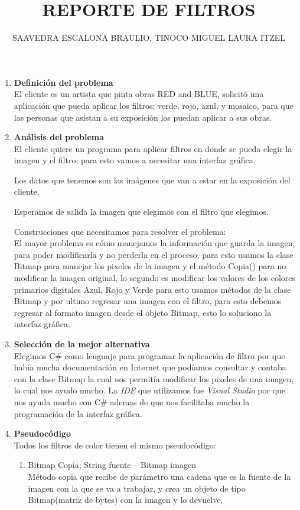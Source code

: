 \documentclass[12pt]{article}
\title{REPORTE DE FILTROS}
\author{SAAVEDRA ESCALONA BRAULIO, TINOCO MIGUEL LAURA ITZEL}
\begin{document}
	\begin{enumerate}
	
	\item \textbf{Definición del problema}\\
	El cliente es un artista que pinta obras RED and BLUE, solicitó una aplicación que pueda aplicar los filtros; verde, rojo, azul, y mosaico, para que las personas que asistan a su exposición los puedan aplicar a sus obras.
	
	\item \textbf{Análisis del problema}\\
	El cliente quiere un programa para aplicar filtros en donde se pueda elegir la imagen y el filtro; para esto vamos a necesitar una interfaz gráfica.
	
	Los datos que tenemos son las imágenes que van a estar en la exposición del cliente.
	
	Esperamos de salida la imagen que elegimos con el filtro que elegimos.
	
	Construcciones que necesitamos para resolver el problema:\\
	El mayor problema es cómo manejamos la información que guarda la imagen, para poder modificarla y no perderla en el proceso, para esto usamos la clase Bitmap para manejar los pixeles de la imagen y el método Copia() para no modificar la imagen original, lo segundo es modificar los valores de los colores primarios digitales Azul, Rojo y Verde para esto usamos métodos de la clase Bitmap y por ultimo regresar una imagen con el filtro, para esto debemos regresar al formato imagen desde el objeto Bitmap, esto lo soluciono la interfaz gráfica.
	
	
	
	\item \textbf{Selección de la mejor alternativa}\\
	Elegimos C\# como lenguaje para programar la aplicación de filtro por que había mucha documentación en Internet que podíamos consultar y contaba con la clase Bitmap la cual nos permitía modificar los pixeles de una imagen, lo cual nos ayudo mucho.
	La {\em IDE} que utilizamos fue {\em Visual Studio} por que nos ayuda mucho con C\# ademas de que nos facilitaba mucho la programación de la interfaz gráfica.
	
	\item \textbf{Pseudocódigo}\\
	Todos los filtros de color tienen el mismo pseudocódigo:
	\begin{enumerate}
	\item Bitmap Copia; String fuente -- Bitmap imagen\\
		Método copia que recibe de parámetro una cadena que es la fuente de la imagen con la que se va a trabajar, y crea un objeto de tipo Bitmap(matriz de bytes) con la imagen y lo devuelve.
		

\end{enumerate}
\end{enumerate}
\end{document}
